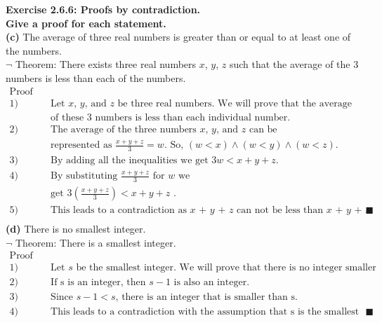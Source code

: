 \documentclass[12pt, letterpaper, twoside]{article}
\begin{document}
\noindent \textbf{Exercise 2.6.6: Proofs by contradiction.}\\
\textbf{Give a proof for each statement.}\\
\textbf{(c)} The average of three real numbers is greater than or equal to at least one of the numbers.\\
\break
$\neg$ Theorem: There exists three real numbers $x$, $y$, $z$ such that the average of the 3 numbers is less than each of the numbers.\\
\begin{align*}
\text{Proof} &\\
1)\quad& \quad \text{Let $x$, $y$, and $z$ be three real numbers. We will prove that the average }\\
  \quad& \quad \text{of these 3 numbers is less than each individual number.}\\
2)\quad& \quad \text{The average of the three numbers $x$, $y$, and $z$ can be }\\
  \quad& \quad \text{represented as } \frac{x + y + z}{3} = w. \text{ So, }(w < x)\land (w < y) \land (w < z) \text{.}\\
3)\quad& \quad \text{By adding all the inequalities we get $3w < x + y + z$.}\\
4)\quad& \quad \text{By substituting $\frac{x + y + z}{3}$ for $w$ we }\\
    \quad& \quad \text{get $3(\frac{x + y + z}{3}) < x + y + z$ .}\\
5)\quad& \quad \text{This leads to a contradiction as $x$ + $y$ + $z$ can not be less than $x$ + $y$ + $z$. } \blacksquare\\
\end{align*}
\break
\textbf{(d)} There is no smallest integer.\\
\break
$\neg$ Theorem: There is a smallest integer.
\begin{align*}
    \text{Proof} &\\
    1) & \quad \text{Let $s$ be the smallest integer. We will prove that there is no integer smaller than s.}\\
    2) & \quad \text{If s is an integer, then $s - 1$ is also an integer.}\\
    3) & \quad \text{Since $s-1 < s$, there is an integer that is smaller than s.}\\
    4) & \quad \text{This leads to a contradiction with the assumption that s is the smallest integer. }\blacksquare\\
\end{align*}
\end{document}
